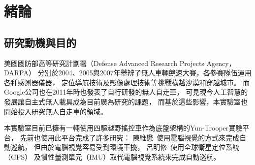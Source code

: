 \chapter{緒論}
\label{c:intro}
\section{研究動機與目的}
美國國防部高等研究計劃署（Defense Advanced Research Projects Agency，DARPA）
分別於2004、2005與2007年舉辨了無人車輛競速大賽，各參賽隊伍運用各種感測器儀器，
定位導航技術及影像處理技術等挑戰橫越沙漠和穿越城市。
而Google公司也在2011年時也發表了自行研發的無人自走車，
可見現今人工智慧的發展讓自主式無人載具成為目前廣為研究的課題，
而基於這些影響，本實驗室也開始投入研究無人自走車的領域。

本實驗室目前已擁有一輛使用四驅越野搖控車作為底盤架構的Yun-Trooper實驗平台，
先前也使用此平台完成了許多研究：
陳維懋~\cite{Chen:2011:Thesis}使用電腦視覺的方式來完成自動巡航，
但由於電腦視覺容易受到環境干擾，
呂明修~\cite{Liu:2012:Thesis}使用全球衛星定位系統（GPS）
及慣性量測單元（IMU）取代電腦視覺系統來完成自動巡航。

